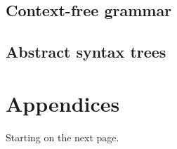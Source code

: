 \documentclass[a4paper,11pt]{article}
\begin{document}
\subsection{Context-free grammar}

\subsection{Abstract syntax trees}

\appendix
\section{Appendices}

Starting on the next page.




\end{document}
